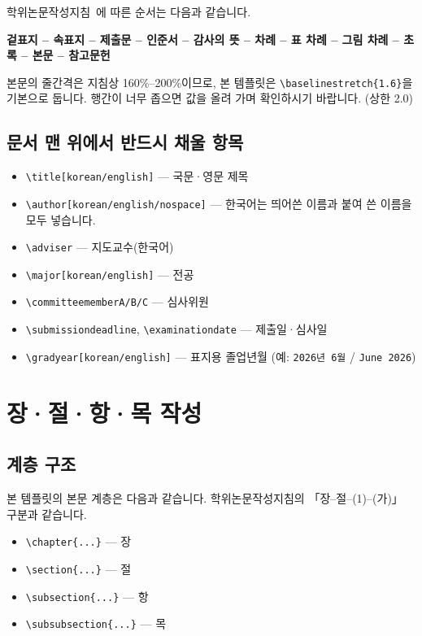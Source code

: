 \documentclass[korean]{aisw}
\begin{document}
학위논문작성지침~\cite{sogang2025aiswthesisguide}에 따른 순서는 다음과 같습니다.

\textbf{겉표지 -- 속표지 -- 제출문 -- 인준서 -- 감사의 뜻 -- 차례 --
표 차례 -- 그림 차례 -- 초록 -- 본문 -- 참고문헌}

본문의 줄간격은 지침상 160\%--200\%이므로, 본 템플릿은
\texttt{\textbackslash baselinestretch\{1.6\}}을 기본으로 둡니다.
행간이 너무 좁으면 값을 올려 가며 확인하시기 바랍니다. (상한 2.0)

\section{문서 맨 위에서 반드시 채울 항목}

\begin{itemize}
    \item \texttt{\textbackslash title[korean/english]} — 국문·영문 제목
    \item \texttt{\textbackslash author[korean/english/nospace]} —
          한국어는 띄어쓴 이름과 붙여 쓴 이름을 모두 넣습니다.
    \item \texttt{\textbackslash adviser} — 지도교수(한국어)
    \item \texttt{\textbackslash major[korean/english]} — 전공
    \item \texttt{\textbackslash committeememberA/B/C} — 심사위원
    \item \texttt{\textbackslash submissiondeadline},
          \texttt{\textbackslash examinationdate} — 제출일·심사일
    \item \texttt{\textbackslash gradyear[korean/english]} — 표지용 졸업년월
          (예: \texttt{2026년 6월} / \texttt{June 2026})
\end{itemize}

\chapter{장·절·항·목 작성}

\section{계층 구조}\label{sec:heading}

본 템플릿의 본문 계층은 다음과 같습니다.
학위논문작성지침의 「장--절--(1)--(가)」 구분과 같습니다.

\begin{itemize}
    \item \texttt{\textbackslash chapter\{...\}} — 장
    \item \texttt{\textbackslash section\{...\}} — 절
    \item \texttt{\textbackslash subsection\{...\}} — 항
    \item \texttt{\textbackslash subsubsection\{...\}} — 목
\end{itemize}
\end{document}
